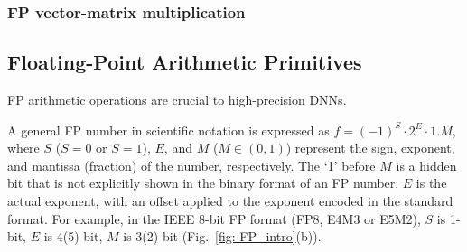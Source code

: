 \subsubsection{FP vector-matrix multiplication}

\fi





\subsection{Floating-Point Arithmetic Primitives}

FP arithmetic operations are crucial to high-precision DNNs. 

 A general FP number in scientific notation is expressed as $f=(-1)^{S}\cdot 2^{E}\cdot 1.M$,
where $S$ ($S=0$ or $S=1$), $E$, and $M$ ($M\in(0,1)$) represent the sign, exponent, and mantissa (fraction) of the number, respectively.
The `1' before $M$ is a hidden bit that is not explicitly shown in the binary format of an FP number. 
$E$ is the actual exponent, with an offset applied to the exponent encoded in the standard format.
For example, in the IEEE 8-bit FP format (FP8, E4M3 or E5M2), $S$ is 1-bit, $E$ is 4(5)-bit, $M$ is 3(2)-bit (Fig.~\ref{fig: FP_intro}(b)).



